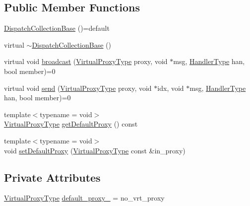 \subsection*{Public Member Functions}
\begin{DoxyCompactItemize}
\item 
\hyperlink{structvt_1_1vrt_1_1collection_1_1_dispatch_collection_base_a96f6594a04faa4519a553b18bf2b2e6d}{Dispatch\+Collection\+Base} ()=default
\item 
virtual \hyperlink{structvt_1_1vrt_1_1collection_1_1_dispatch_collection_base_a8c27f42a9b91fd31b0aa7b30da4d614c}{$\sim$\+Dispatch\+Collection\+Base} ()
\item 
virtual void \hyperlink{structvt_1_1vrt_1_1collection_1_1_dispatch_collection_base_aa2f5d59eefb10ba8c7ba2432efff9ad3}{broadcast} (\hyperlink{namespacevt_a1b417dd5d684f045bb58a0ede70045ac}{Virtual\+Proxy\+Type} proxy, void $\ast$msg, \hyperlink{namespacevt_af64846b57dfcaf104da3ef6967917573}{Handler\+Type} han, bool member)=0
\item 
virtual void \hyperlink{structvt_1_1vrt_1_1collection_1_1_dispatch_collection_base_a207db071c213e894568a8b7ff217cd58}{send} (\hyperlink{namespacevt_a1b417dd5d684f045bb58a0ede70045ac}{Virtual\+Proxy\+Type} proxy, void $\ast$idx, void $\ast$msg, \hyperlink{namespacevt_af64846b57dfcaf104da3ef6967917573}{Handler\+Type} han, bool member)=0
\item 
{\footnotesize template$<$typename  = void$>$ }\\\hyperlink{namespacevt_a1b417dd5d684f045bb58a0ede70045ac}{Virtual\+Proxy\+Type} \hyperlink{structvt_1_1vrt_1_1collection_1_1_dispatch_collection_base_a7ff0d68977083eb225da837b6a8cef7d}{get\+Default\+Proxy} () const
\item 
{\footnotesize template$<$typename  = void$>$ }\\void \hyperlink{structvt_1_1vrt_1_1collection_1_1_dispatch_collection_base_a3c5ad977c57108fdcfcc3c2b443428e3}{set\+Default\+Proxy} (\hyperlink{namespacevt_a1b417dd5d684f045bb58a0ede70045ac}{Virtual\+Proxy\+Type} const \&in\+\_\+proxy)
\end{DoxyCompactItemize}
\subsection*{Private Attributes}
\begin{DoxyCompactItemize}
\item 
\hyperlink{namespacevt_a1b417dd5d684f045bb58a0ede70045ac}{Virtual\+Proxy\+Type} \hyperlink{structvt_1_1vrt_1_1collection_1_1_dispatch_collection_base_ad192b793a3929262a6b44951b628d215}{default\+\_\+proxy\+\_\+} = no\+\_\+vrt\+\_\+proxy
\end{DoxyCompactItemize}


